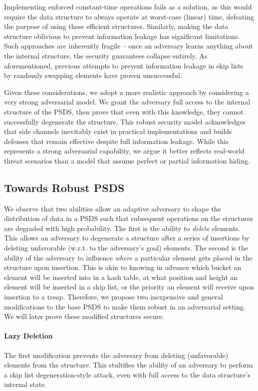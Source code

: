 Implementing enforced constant-time operations fails as a solution, as this would require the data structure to always operate at worst-case (linear) time, defeating the purpose of using these efficient structures. Similarly, making the data structure oblivious to prevent information leakage has significant limitations. Such approaches are inherently fragile -- once an adversary learns anything about the internal structure, the security guarantees collapse entirely. As aforementioned, previous attempts to prevent information leakage in skip lists~\cite{nussbaum2019skiplist} by randomly swapping elements have proven unsuccessful.

Given these considerations, we adopt a more realistic approach by considering a very strong adversarial model. We grant the adversary full access to the internal structure of the PSDS, then prove that even with this knowledge, they cannot successfully degenerate the structure. This robust security model acknowledges that side channels inevitably exist in practical implementations and builds defenses that remain effective despite full information leakage. While this represents a strong adversarial capability, we argue it better reflects real-world threat scenarios than a model that assume perfect or partial information hiding.

\subsection{Towards Robust PSDS}

We observe that two abilities allow an adaptive adversary to shape the distribution of data in a PSDS such that subsequent operations on the structures are degraded with high probability. The first is the ability to \emph{delete} elements. This allows an adversary to degenerate a structure after a series of insertions by deleting unfavorable (w.r.t. to the adversary's goal) elements. The second is the ability of the adversary to influence \emph{where} a particular element gets placed in the structure upon insertion. This is akin to knowing in advance which bucket an element will be inserted into in a hash table, at what position and height an element will be inserted in a skip list, or the priority an element will receive upon insertion to a treap. Therefore, we propose two inexpensive and general modifications to the base PSDS to make them robust in an adversarial setting. We will later prove these modified structures secure. 

\paragraph{Lazy Deletion} The first modification prevents the adversary from deleting (unfavorable) elements from the structure. This stultifies the ability of an adversary to perform a skip list degeneration-style attack, even with full access to the data structure's internal state. 

